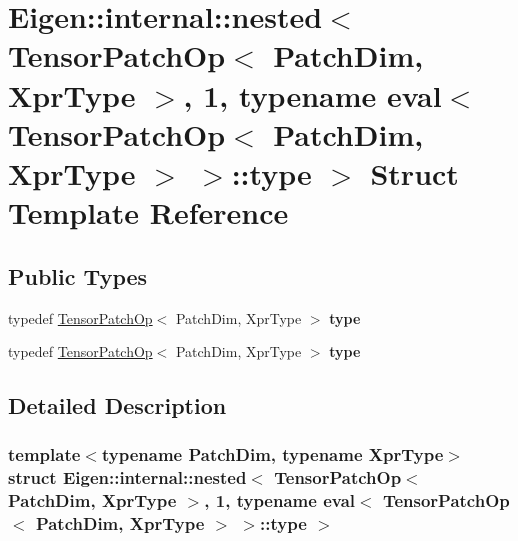 \hypertarget{struct_eigen_1_1internal_1_1nested_3_01_tensor_patch_op_3_01_patch_dim_00_01_xpr_type_01_4_00_017d8350baeaabc5f17d005b7a04cfaf28}{}\section{Eigen\+:\+:internal\+:\+:nested$<$ Tensor\+Patch\+Op$<$ Patch\+Dim, Xpr\+Type $>$, 1, typename eval$<$ Tensor\+Patch\+Op$<$ Patch\+Dim, Xpr\+Type $>$ $>$\+:\+:type $>$ Struct Template Reference}
\label{struct_eigen_1_1internal_1_1nested_3_01_tensor_patch_op_3_01_patch_dim_00_01_xpr_type_01_4_00_017d8350baeaabc5f17d005b7a04cfaf28}
\subsection*{Public Types}
\begin{DoxyCompactItemize}
\item 
\mbox{\label{struct_eigen_1_1internal_1_1nested_3_01_tensor_patch_op_3_01_patch_dim_00_01_xpr_type_01_4_00_017d8350baeaabc5f17d005b7a04cfaf28_a15cc52483741ab88259c03bd13a00dcd}} 
typedef \hyperlink{class_eigen_1_1_tensor_patch_op}{Tensor\+Patch\+Op}$<$ Patch\+Dim, Xpr\+Type $>$ {\bfseries type}
\item 
\mbox{\label{struct_eigen_1_1internal_1_1nested_3_01_tensor_patch_op_3_01_patch_dim_00_01_xpr_type_01_4_00_017d8350baeaabc5f17d005b7a04cfaf28_a15cc52483741ab88259c03bd13a00dcd}} 
typedef \hyperlink{class_eigen_1_1_tensor_patch_op}{Tensor\+Patch\+Op}$<$ Patch\+Dim, Xpr\+Type $>$ {\bfseries type}
\end{DoxyCompactItemize}


\subsection{Detailed Description}
\subsubsection*{template$<$typename Patch\+Dim, typename Xpr\+Type$>$\newline
struct Eigen\+::internal\+::nested$<$ Tensor\+Patch\+Op$<$ Patch\+Dim, Xpr\+Type $>$, 1, typename eval$<$ Tensor\+Patch\+Op$<$ Patch\+Dim, Xpr\+Type $>$ $>$\+::type $>$}



